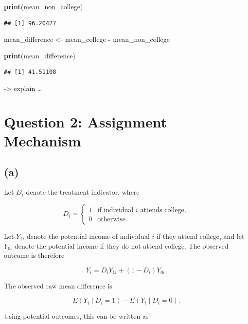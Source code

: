 \documentclass[
]{article}
\newenvironment{Shaded}{\begin{snugshade}}{\end{snugshade}}
\newcommand{\FunctionTok}[1]{\textcolor[rgb]{0.13,0.29,0.53}{\textbf{#1}}}
\newcommand{\NormalTok}[1]{#1}
\newcommand{\OtherTok}[1]{\textcolor[rgb]{0.56,0.35,0.01}{#1}}
\newcommand{\SpecialCharTok}[1]{\textcolor[rgb]{0.81,0.36,0.00}{\textbf{#1}}}
\begin{document}
\begin{Shaded}
\begin{Highlighting}[]
\FunctionTok{print}\NormalTok{(mean\_non\_college)}
\end{Highlighting}
\end{Shaded}

\begin{verbatim}
## [1] 96.20427
\end{verbatim}

\begin{Shaded}
\begin{Highlighting}[]
\NormalTok{mean\_difference }\OtherTok{\textless{}{-}}\NormalTok{ mean\_college }\SpecialCharTok{{-}}\NormalTok{ mean\_non\_college}

\FunctionTok{print}\NormalTok{(mean\_difference)}
\end{Highlighting}
\end{Shaded}

\begin{verbatim}
## [1] 41.51108
\end{verbatim}

-\textgreater{} explain \ldots{}

\section{Question 2: Assignment
Mechanism}\label{question-2-assignment-mechanism}

\subsection{(a)}\label{a}

Let \(D_i\) denote the treatment indicator, where

\[
D_i =
\begin{cases}
1 & \text{if individual } i \text{ attends college},\\
0 & \text{otherwise}.
\end{cases}
\]

Let \(Y_{1i}\) denote the potential income of individual \(i\) if they
attend college, and let \(Y_{0i}\) denote the potential income if they
do not attend college. The observed outcome is therefore

\[
Y_i = D_iY_{1i} + (1-D_i)Y_{0i}.
\]

The observed raw mean difference is

\[
E(Y_i \mid D_i = 1) - E(Y_i \mid D_i = 0).
\]

Using potential outcomes, this can be written as
\end{document}
